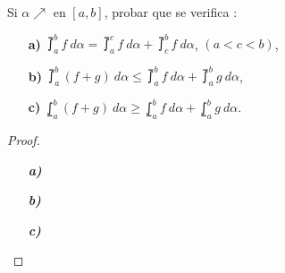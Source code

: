 \setcounter{section}{7}
\setcounter{exercise}{10}

\begin{exercise}

Si $\alpha \nearrow$ en $\left[a,b\right]$, probar que se verifica :

\begin{itemize}
  \item[\textbf{a)}]$\upint_{a}^{b} f\ d\alpha = \upint_a^c f\ d\alpha + \upint_c^b f\ d\alpha$, $\left(a<c<b\right)$,
  \item[\textbf{b)}]$\upint_{a}^{b} \left(f+g\right)\ d\alpha \leq \upint_{a}^{b} f\ d\alpha + \upint_{a}^{b} g\ d\alpha$,
  \item[\textbf{c)}]$\lowint_{a}^{b} \left(f+g\right)\ d\alpha \geq \lowint_{a}^{b} f\ d\alpha + \lowint_{a}^{b} g\ d\alpha$.
\end{itemize}

\end{exercise}

\begin{proof}

\begin{itemize}
  \item[\textbf{\textit{a)}}]
  \item[\textbf{\textit{b)}}]
  \item[\textbf{\textit{c)}}]
\end{itemize}

\end{proof}

